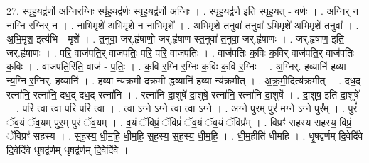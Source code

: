 \documentclass[17pt]{extarticle}
\begin{document}
27. स्पृ॒ह॒यद्व॑र्णो अ॒ग्निर॒ग्निः स्पृ॑ह॒यद्व॑र्णः स्पृह॒यद्व॑र्णो अ॒ग्निः । . स्पृ॒ह॒यद्व॑र्ण॒ इति॑ स्पृह॒यत् - व॒र्णः॒ । . अ॒ग्निर् न नाग्नि र॒ग्निर् न । . नाभि॒मृशे॑ अभि॒मृशे॒ न नाभि॒मृशे᳚ । . अ॒भि॒मृशे॑ त॒नुवा॑ त॒नुवा॑ ऽभि॒मृशे॑ अभि॒मृशे॑ त॒नुवा᳚ । . अ॒भि॒मृश॒ इत्य॑भि - मृशे᳚ । . त॒नुवा॒ जर्.हृ॑षाणो॒ जर्.हृ॑षाण स्त॒नुवा॑ त॒नुवा॒ जर्.हृ॑षाणः । . जर्.हृ॑षाण॒ इति॒ जर्.हृ॑षाणः । . परि॒ वाज॑पति॒र् वाज॑पतिः॒ परि॒ परि॒ वाज॑पतिः । . वाज॑पतिः क॒विः क॒विर् वाज॑पति॒र् वाज॑पतिः क॒विः । . वाज॑पति॒रिति॒ वाज॑ - प॒तिः॒ । . क॒वि र॒ग्नि र॒ग्निः क॒विः क॒वि र॒ग्निः । . अ॒ग्निर्. ह॒व्यानि॑ ह॒व्या न्य॒ग्नि र॒ग्निर्. ह॒व्यानि॑ । . ह॒व्या न्य॑क्रमी दक्रमी द्ध॒व्यानि॑ ह॒व्या न्य॑क्रमीत् । . अ॒क्र॒मी॒दित्य॑क्रमीत् । . दध॒द् रत्ना॑नि॒ रत्ना॑नि॒ दध॒द् दध॒द् रत्ना॑नि । . रत्ना॑नि दा॒शुषे॑ दा॒शुषे॒ रत्ना॑नि॒ रत्ना॑नि दा॒शुषे᳚ । . दा॒शुष॒ इति॑ दा॒शुषे᳚ । . परि॑ त्वा त्वा॒ परि॒ परि॑ त्वा । . त्वा॒ ऽग्ने॒ ऽग्ने॒ त्वा॒ त्वा॒ ऽग्ने॒ । . अ॒ग्ने॒ पुर॒म् पुर॑ मग्ने ऽग्ने॒ पुर᳚म् । . पुरं॑ ॅव॒यं ॅव॒यम् पुर॒म् पुरं॑ ॅव॒यम् । . व॒यं ॅविप्रं॒ ॅविप्रं॑ ॅव॒यं ॅव॒यं ॅविप्र᳚म् । . विप्रꣳ॑ सहस्य सहस्य॒ विप्रं॒ ॅविप्रꣳ॑ सहस्य । . स॒ह॒स्य॒ धी॒म॒हि॒ धी॒म॒हि॒ स॒ह॒स्य॒ स॒ह॒स्य॒ धी॒म॒हि॒ । . धी॒म॒हीति॑ धीमहि । . धृ॒षद्व॑र्णम् दि॒वेदि॑वे दि॒वेदि॑वे धृ॒षद्व॑र्णम् धृ॒षद्व॑र्णम् दि॒वेदि॑वे । \newline
\end{document}
